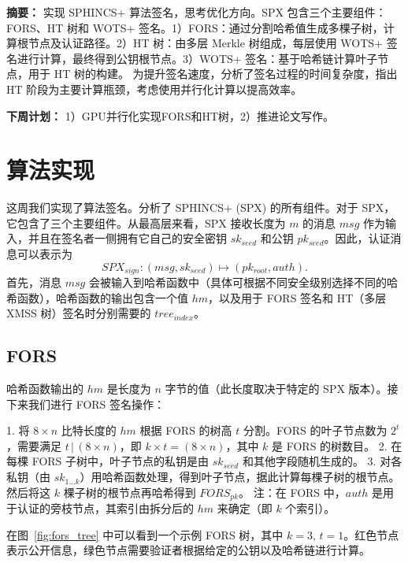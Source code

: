 \documentclass[report]{../../custom}
\begin{document}
\maketitle

\noindent \textbf{摘要：}
实现 SPHINCS+ 算法签名，思考优化方向。SPX 包含三个主要组件：FORS、HT 树和 WOTS+ 签名。1）FORS：通过分割哈希值生成多棵子树，计算根节点及认证路径。2）HT 树：由多层 Merkle 树组成，每层使用 WOTS+ 签名进行计算，最终得到公钥根节点。3）WOTS+ 签名：基于哈希链计算叶子节点，用于 HT 树的构建。
为提升签名速度，分析了签名过程的时间复杂度，指出 HT 阶段为主要计算瓶颈，考虑使用并行化计算以提高效率。

\vskip 0.5cm

\noindent \textbf{下周计划：} 1）GPU并行化实现FORS和HT树，2）推进论文写作。

\section{算法实现}

这周我们实现了算法签名。分析了 SPHINCS+ (SPX) 的所有组件。对于 SPX，它包含了三个主要组件。从最高层来看，SPX 接收长度为 $m$ 的消息 $msg$ 作为输入，并且在签名者一侧拥有它自己的安全密钥 $sk_{seed}$ 和公钥 $pk_{seed}$。因此，认证消息可以表示为
\[
  SPX_{sign}: (msg, sk_{seed}) \mapsto (pk_{root}, auth).
\]
首先，消息 $msg$ 会被输入到哈希函数中（具体可根据不同安全级别选择不同的哈希函数），哈希函数的输出包含一个值 $hm$，以及用于 FORS 签名和 HT（多层 XMSS 树）签名时分别需要的 $tree_{index}$。

\subsection{FORS}

哈希函数输出的 $hm$ 是长度为 $n$ 字节的值（此长度取决于特定的 SPX 版本）。接下来我们进行 FORS 签名操作：

1. 将 $8 \times n$ 比特长度的 $hm$ 根据 FORS 的树高 $t$ 分割。FORS 的叶子节点数为 $2^t$，需要满足 $t \,|\, (8 \times n)$，即 $k \times t = (8 \times n)$，其中 $k$ 是 FORS 的树数目。
2. 在每棵 FORS 子树中，叶子节点的私钥是由 $sk_{seed}$ 和其他字段随机生成的。
3. 对各私钥（由 $sk_{1 \dots k}$）用哈希函数处理，得到叶子节点，据此计算每棵子树的根节点。然后将这 $k$ 棵子树的根节点再哈希得到 $FORS_{pk}$。
注：在 FORS 中，$auth$ 是用于认证的旁枝节点，其索引由拆分后的 $hm$ 来确定（即 $k$ 个索引）。

在图~\ref{fig:fors_tree} 中可以看到一个示例 FORS 树，其中 $k=3,\, t=1$。红色节点表示公开信息，绿色节点需要验证者根据给定的公钥以及哈希链进行计算。
\end{document}
